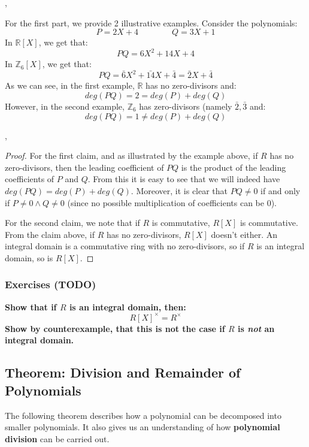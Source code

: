 \documentclass{exam}
\begin{document}
\sep 

For the first part, we provide 2 illustrative examples. Consider the polynomials:
\[
P = 2X + 4 \qquad \qquad Q = 3X + 1
\]
In $\mathbb{R}[X]$, we get that:
\[
PQ = 6X^2 + 14X + 4
\]
In $\mathbb{Z}_6[X]$, we get that:
\[
PQ = \bar{6}X^2 + \bar{14}X + \bar{4} = \bar{2}X + \bar{4}
\]
As we can see, in the first example, $\mathbb{R}$ has no zero-divisors and:
\[
deg(PQ) = 2 = deg(P) + deg(Q)
\]
However, in the second example, $\mathbb{Z}_6$ has zero-divisors (namely $\bar{2}, \bar{3}$ and:
\[
deg(PQ) = 1 \neq deg(P) + deg(Q)
\]

\sep

\begin{proof}

For the first claim, and as illustrated by the example above, if $R$ has no zero-divisors, then the leading coefficient of $PQ$ is the product of the leading coefficients of $P$ and $Q$. From this it is easy to see that we will indeed have $deg(PQ) = deg(P) + deg(Q)$. Moreover, it is clear that $PQ \neq 0$ if and only if $P \neq 0 \wedge Q \neq 0$ (since no possible multiplication of coefficients can be 0).

\bigskip

For the second claim, we note that if $R$ is commutative, $R[X]$ is commutative. From the claim above, if $R$ has no zero-divisors, $R[X]$ doesn't either. An integral domain is a commutative ring with no zero-divisors, so if $R$ is an integral domain, so is $R[X]$.

\end{proof}

\subsubsection{Exercises (TODO)}

\begin{questions}

\question \textbf{Show that if $R$ is an integral domain, then:
\[
R[X]^\times = R^\times
\]
Show by counterexample, that this is not the case if $R$ is \textit{not} an integral domain.}

\end{questions}

\subsection{Theorem: Division and Remainder of Polynomials}

The following theorem describes how a polynomial can be decomposed into smaller polynomials. It also gives us an understanding of how \textbf{polynomial division} can be carried out.
\end{document}
